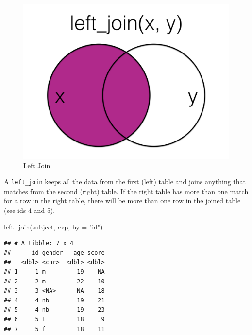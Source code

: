 \documentclass[
  oneside]{book}
\newenvironment{Shaded}{\begin{snugshade}}{\end{snugshade}}
\newcommand{\AttributeTok}[1]{\textcolor[rgb]{0.77,0.63,0.00}{#1}}
\newcommand{\FunctionTok}[1]{\textcolor[rgb]{0.00,0.00,0.00}{#1}}
\newcommand{\NormalTok}[1]{#1}
\newcommand{\StringTok}[1]{\textcolor[rgb]{0.31,0.60,0.02}{#1}}
\begin{document}
\begin{figure}

{\centering \includegraphics[width=1\linewidth]{images/joins/left_join} 

}

\caption{Left Join}\label{fig:img-left-join}
\end{figure}

A \texttt{left\_join} keeps all the data from the first (left) table and joins anything that matches from the second (right) table. If the right table has more than one match for a row in the right table, there will be more than one row in the joined table (see ids 4 and 5).

\begin{Shaded}
\begin{Highlighting}[]
\FunctionTok{left\_join}\NormalTok{(subject, exp, }\AttributeTok{by =} \StringTok{"id"}\NormalTok{)}
\end{Highlighting}
\end{Shaded}

\begin{verbatim}
## # A tibble: 7 x 4
##      id gender   age score
##   <dbl> <chr>  <dbl> <dbl>
## 1     1 m         19    NA
## 2     2 m         22    10
## 3     3 <NA>      NA    18
## 4     4 nb        19    21
## 5     4 nb        19    23
## 6     5 f         18     9
## 7     5 f         18    11
\end{verbatim}
\end{document}
